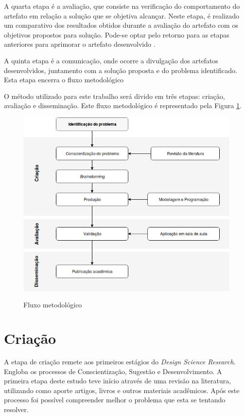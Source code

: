 \documentclass[
	12pt,				%
	oneside,			%
	a4paper,			%
	english,			%
	french,				%
	spanish,			%
	brazil,				%
	]{abntex2}
\begin{document}
A quarta etapa é a avaliação, que consiste na verificação do comportamento do artefato em relação a solução que se objetiva alcançar. Neste etapa, é realizado um comparativo dos resultados obtidos durante a avaliação do artefato com os objetivos propostos para solução. Pode-se optar pelo retorno para as etapas anteriores para aprimorar o artefato desenvolvido \cite{dresch:2015}.

A quinta etapa é a comunicação, onde ocorre a divulgação dos artefatos desenvolvidos, juntamento com a solução proposta e do problema identificado. Esta etapa encerra o fluxo metodológico \cite{dresch:2015}

O método utilizado para este trabalho será divido em três etapas: criação, avaliação e disseminação. Este fluxo metodológico é representado pela Figura \ref{fig:fluxoMetologico}.

\begin{figure}[ht]
\centering
\caption{Fluxo metodológico}
\includegraphics[width=1\textwidth]{imagens/dsr.jpg}
\label{fig:fluxoMetologico}
\sourceAuthor
\end{figure}

\section{Criação}

A etapa de criação remete aos primeiros estágios do \textit{Design Science Research}. Engloba os processos de Conscientização, Sugestão e Desenvolvimento. A primeira etapa deste estudo teve início através de uma revisão na literatura, utilizando como aporte artigos, livros e outros materiais acadêmicos. Após este processo foi possível compreender melhor o problema que esta se tentando resolver.
\end{document}
